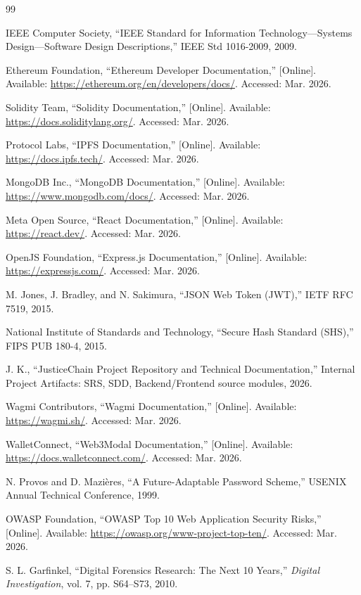 \documentclass[conference]{IEEEtran}
\begin{document}
\begin{thebibliography}{99}

IEEE Computer Society, ``IEEE Standard for Information Technology---Systems Design---Software Design Descriptions,'' IEEE Std 1016-2009, 2009.

Ethereum Foundation, ``Ethereum Developer Documentation,'' [Online]. Available: \url{https://ethereum.org/en/developers/docs/}. Accessed: Mar. 2026.

Solidity Team, ``Solidity Documentation,'' [Online]. Available: \url{https://docs.soliditylang.org/}. Accessed: Mar. 2026.

Protocol Labs, ``IPFS Documentation,'' [Online]. Available: \url{https://docs.ipfs.tech/}. Accessed: Mar. 2026.

MongoDB Inc., ``MongoDB Documentation,'' [Online]. Available: \url{https://www.mongodb.com/docs/}. Accessed: Mar. 2026.

Meta Open Source, ``React Documentation,'' [Online]. Available: \url{https://react.dev/}. Accessed: Mar. 2026.

OpenJS Foundation, ``Express.js Documentation,'' [Online]. Available: \url{https://expressjs.com/}. Accessed: Mar. 2026.

M. Jones, J. Bradley, and N. Sakimura, ``JSON Web Token (JWT),'' IETF RFC 7519, 2015.

National Institute of Standards and Technology, ``Secure Hash Standard (SHS),'' FIPS PUB 180-4, 2015.

J. K., ``JusticeChain Project Repository and Technical Documentation,'' Internal Project Artifacts: SRS, SDD, Backend/Frontend source modules, 2026.

Wagmi Contributors, ``Wagmi Documentation,'' [Online]. Available: \url{https://wagmi.sh/}. Accessed: Mar. 2026.

WalletConnect, ``Web3Modal Documentation,'' [Online]. Available: \url{https://docs.walletconnect.com/}. Accessed: Mar. 2026.

N. Provos and D. Mazi\`eres, ``A Future-Adaptable Password Scheme,'' USENIX Annual Technical Conference, 1999.

OWASP Foundation, ``OWASP Top 10 Web Application Security Risks,'' [Online]. Available: \url{https://owasp.org/www-project-top-ten/}. Accessed: Mar. 2026.

S. L. Garfinkel, ``Digital Forensics Research: The Next 10 Years,'' \textit{Digital Investigation}, vol. 7, pp. S64--S73, 2010.

\end{thebibliography}
\end{document}
